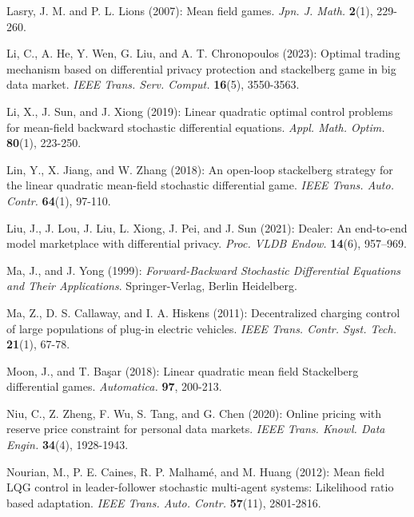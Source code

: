 \documentclass[11pt]{article}
\numberwithin{equation}{section}
\begin{document}
\begin{thebibliography}{}
{		
		Lasry, J. M. and P. L. Lions (2007): Mean field games. {\it Jpn. J. Math.} \textbf{2}(1), 229-260.
		
		Li, C., A. He, Y. Wen, G. Liu, and A. T. Chronopoulos (2023): Optimal trading mechanism based on differential privacy protection and stackelberg game in big data market. {\it IEEE Trans. Serv. Comput.} {\bf16}(5), 3550-3563.
		
		Li, X., J. Sun, and J. Xiong (2019): Linear quadratic optimal control problems for mean-field backward stochastic differential equations. {\it Appl. Math. Optim.} {\bf 80}(1), 223-250.
		
		Lin, Y., X. Jiang, and W. Zhang (2018): An open-loop stackelberg strategy for the linear quadratic mean-field stochastic differential game. {\it IEEE Trans. Auto. Contr.} {\bf 64}(1), 97-110.
		
		Liu, J., J. Lou, J. Liu, L. Xiong, J. Pei, and J. Sun (2021): Dealer: An end-to-end model marketplace with differential privacy. {\it Proc. VLDB Endow.} {\bf 14}(6), 957–969.
        
        
		Ma, J., and J. Yong (1999): {\it Forward-Backward Stochastic Differential Equations and Their Applications}. Springer-Verlag, Berlin Heidelberg.
        
        
		Ma, Z., D. S. Callaway, and I. A. Hiskens (2011): Decentralized charging control of large populations of plug-in electric vehicles. {\it IEEE Trans. Contr. Syst. Tech.} {\bf 21}(1), 67-78.
		
		Moon, J., and T. Başar (2018): Linear quadratic mean field Stackelberg differential games. {\it Automatica.} {\bf 97}, 200-213.
		
		
		Niu, C., Z. Zheng, F. Wu, S. Tang, and G. Chen (2020): Online pricing with reserve price constraint for personal data markets. {\it IEEE Trans. Knowl. Data Engin.} {\bf 34}(4), 1928-1943.
        
		Nourian, M., P. E. Caines, R. P.  Malhamé, and M. Huang (2012): Mean field LQG control in leader-follower stochastic multi-agent systems: Likelihood ratio based adaptation. {\it IEEE Trans. Auto. Contr.} {\bf 57}(11), 2801-2816.
		
}
\end{thebibliography}
\end{document}
